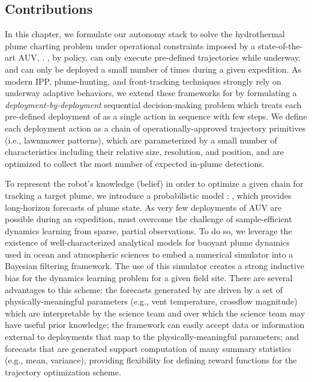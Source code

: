 \subsection{Contributions}
In this chapter, we formulate our autonomy stack \PHORTEX to solve the hydrothermal plume charting problem under operational constraints imposed by a state-of-the-art AUV, \Sentry. \Sentry, by policy, can only execute pre-defined trajectories while underway, and can only be deployed a small number of times during a given expedition. As modern IPP, plume-hunting, and front-tracking techniques strongly rely on underway adaptive behaviors, we extend these frameworks for \Sentry by formulating a \emph{deployment-by-deployment} sequential decision-making problem which treats each pre-defined deployment of \Sentry as a single action in sequence with few steps. We define each deployment action as a chain of operationally-approved trajectory primitives (i.e., lawnmower patterns), which are parameterized by a small number of characteristics including their relative size, resolution, and position, and are optimized to collect the most number of expected in-plume detections.

To represent the robot's knowledge (belief) in order to optimize a given chain for tracking a target plume, we introduce a probabilistic model \PHUMES: \phumes, which provides long-horizon forecasts of plume state. As very few deployments of AUV \Sentry are possible during an expedition, \PHUMES must overcome the challenge of sample-efficient dynamics learning from sparse, partial observations. To do so, we leverage the existence of well-characterized analytical models for buoyant plume dynamics used in ocean and atmospheric sciences to embed a numerical simulator into a Bayesian filtering framework. The use of this simulator creates a strong inductive bias for the dynamics learning problem for a given field site. There are several advantages to this scheme: the forecasts generated by \PHUMES are driven by a set of physically-meaningful parameters (e.g., vent temperature, crossflow magnitude) which are interpretable by the science team and over which the science team may have useful prior knowledge; the \PHUMES framework can easily accept data or information external to \Sentry deployments that map to the physically-meaningful parameters; and forecasts that are generated support computation of many summary statistics (e.g., mean, variance), providing flexibility for defining reward functions for the trajectory optimization scheme.

